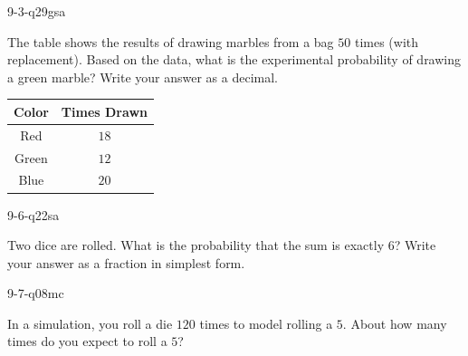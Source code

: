 \begin{practiceQuestion}{9-3-q29}{gsa}
\begin{questionText}
The table shows the results of drawing marbles from a bag $50$ times (with replacement). Based on the data, what is the experimental probability of drawing a green marble? Write your answer as a decimal.

\begin{center}
\begin{tabular}{|c|c|}
\hline
\textbf{Color} & \textbf{Times Drawn} \\
\hline
Red & $18$ \\
\hline
Green & $12$ \\
\hline
Blue & $20$ \\
\hline
\end{tabular}
\end{center}
\end{questionText}
\end{practiceQuestion}

\begin{practiceQuestion}{9-6-q22}{sa}
\begin{questionText}
Two dice are rolled. What is the probability that the sum is exactly $6$? Write your answer as a fraction in simplest form.
\end{questionText}
\end{practiceQuestion}

\begin{practiceQuestion}{9-7-q08}{mc}
\begin{questionText}
In a simulation, you roll a die $120$ times to model rolling a $5$. About how many times do you expect to roll a $5$?
\end{questionText}
\end{practiceQuestion}
